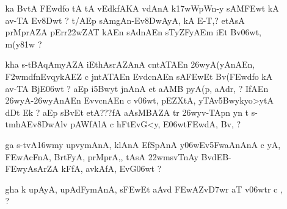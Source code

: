 \def\DevnagVersion{2.15}\documentclass{article}
\begin{document}
\begin{itemize}
\begin{itemize}
               \item[\dn ~na] {\dn Bv\306wmt\?{\rs ,\re} tFZ\0s\2-tprF\322wA, jnA, sEctA\2 EjEvkA upl\2 f,{\rs ,\re} i(y\?tdT\?{\qvb} k\?(AEDfAsn\4\309wc k\? upAyA, trErkt\0\326wyA, {\rs ?\re}}
               
               \item[\dn ca] {\dn Eh\306wnA\2 Dm\0dAysy d\?v-v-y c s\2 DArZAy y\? aAEDfAsEnkA, EdBgA, Ev\38Dw\306wt\?{\rs ,\re} t\? tFZ\0s\2-tprF\322wAZA\2 Ev\38DwAET\2n\2 En\3C4w\?, kA, sE\306wts\2BAvnA, {\rs ?\re}}
               \end{itemize}
               
 \item[\dn 29] \begin{itemize}
            
                \item[\dn ka] {\dn BvtA\2 \3FEwd\?fo tA tA v\4EdkfAKA v\?dAnA\2 k\317wWpWn-y sAM\3FEwt\2 kA av-TA Ev\38Dwt\? {\rs ?\re} t/AEp sAmgAn{\rs -\re}Ev\38DwAyA, kA E-T,{\rs ?\re} etAsA\2 prMprAZA\2 pErr\322wZAT\0 kAEn sAdnAEn s\2TyZFyAEm iEt Bv\306wt, m(y\381w\? {\rs ?\re}}
                
                \item[\dn kha] {\dn s\2-tBAqAmyAZA iEthAsrAZAnA\2 cntATA\0En \326wyA(yA\0nAEn{\rs ,\re} \3F2wmdf\0nEvqykAEZ c jntATA\0En Evd\?cnAEn sA\2\3FEwEt Bv(\3FEwd\?fo kA av-TA\2 BjE\306wt {\rs ?\re} aEp i\35Bwyt\? jnAnA et\? aAMB\?{\qvb} pyA\0(p, aAdr, {\rs ?\re} IfAEn \326wyA-\326wyAnAEn Evv\?cnAEn c v\0\306wt, pEZXtA, yTAv\35Bwykyo>ytA\2 dDt\? Ek {\rs ?\re} aEp s\2BvEt etA{\rs ???\re}fA aAsMBAZA\2 tr\2 \326wyv-TApn y\?n t\? s\2-tmhAEv\38DwAlv\? pAWfAlA c \5hFtEvG\?<y, E\306wt\3FEwdA, Bv\?, {\rs ?\re}}
                
                \item[\dn ga] {\dn s\2-tvA\316wmy\? upv\5ymAnA, klAnA\2{\rs ,\re} EfSpAnA\2{\rs ,\re} y\306wEv\35FwaAnAnA\2 c yA, \3FEwAcFnA, BrtFyA, prMprA,{\rs ,\re} tAsA\2 \322w\?ms\2vT\0nAy BvdEB{\rs -\re}\3FEwyAsAr\?ZA kFfA, avkAfA, EvG\306wt\? {\rs ?\re}} 
                
                \item[\dn gha] {\dn k\? upAyA, upAdFymAnA, s\2\3FEwEt aAv\?{\qvb}d\2 \3FEwAZv\3D7wr aT{\rdt} v\306wtr\2 c \0, {\rs ?\re}}
                

\end{itemize}
\end{itemize}
\end{document}
